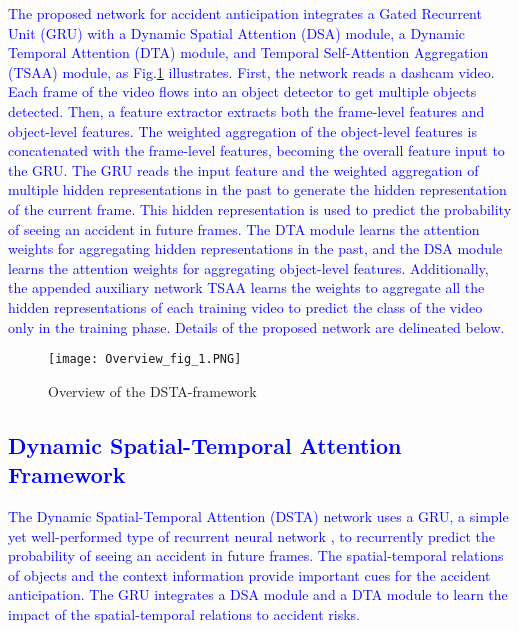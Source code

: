 \documentclass[journal]{IEEEtran}
\begin{document}
\textcolor{blue}{
The proposed network for accident anticipation integrates a Gated Recurrent Unit (GRU) with a Dynamic Spatial Attention (DSA) module, a Dynamic Temporal Attention (DTA) module, and Temporal Self-Attention Aggregation (TSAA) module, as Fig.\ref{fig_overview} illustrates. First, the network reads a dashcam video. Each frame of the video flows into an object detector to get multiple objects detected. Then, a feature extractor extracts both the frame-level features and object-level features. The weighted aggregation of the object-level features is concatenated with the frame-level features, becoming the overall feature input to the GRU. The GRU reads the input feature and the weighted aggregation of multiple hidden representations in the past to generate the hidden representation of the current frame. This hidden representation is used to predict the probability of seeing an accident in future frames. The DTA module learns the attention weights for aggregating hidden representations in the past, and the DSA module learns the attention weights for aggregating object-level features. Additionally, the appended auxiliary network TSAA learns the weights to aggregate all the hidden representations of each training video to predict the class of the video only in the training phase. Details of the proposed network are delineated below.}
\begin{figure}[tb]
\centering
\texttt{[image: Overview\_fig\_1.PNG]}
\caption{Overview of the DSTA-framework}
\label{fig_overview}
\end{figure}



\subsection{\textcolor{blue}{Dynamic Spatial-Temporal Attention Framework}}
\label{sub:dsta}

\textcolor{blue}{The Dynamic Spatial-Temporal Attention (DSTA) network uses a GRU, a simple yet well-performed type of recurrent neural network \cite{chung2014empirical}, to recurrently predict the probability of seeing an accident in future frames. The spatial-temporal relations of objects and the context information provide important cues for the accident anticipation. The GRU integrates a DSA module and a DTA module to learn the impact of the spatial-temporal relations to accident risks.}
\end{document}
